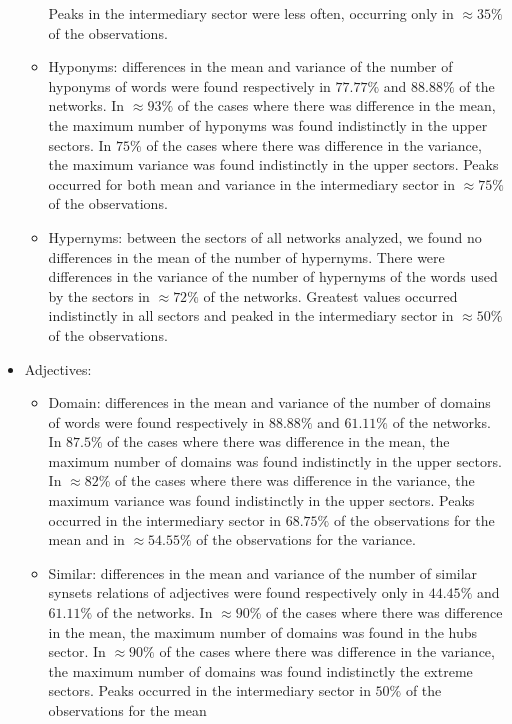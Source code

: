 \begin{itemize}
\begin{itemize}
				Peaks in the intermediary sector were less often, occurring only in $\approx 35\%$ of the observations.
			\item Hyponyms:
				differences in the mean and variance of the number of hyponyms of words were found respectively in $77.77\%$ and $88.88\%$ of the networks.
				In $\approx 93\%$ of the cases where there was difference in the mean, 
				the maximum number of hyponyms was found indistinctly in the upper sectors.
				In $75\%$ of the cases where there was difference in the variance, 
				the maximum variance was found indistinctly in the upper sectors.
				Peaks occurred for both mean and variance in the intermediary sector in $\approx 75\%$ of the observations.
			\item Hypernyms:
				between the sectors of all networks analyzed, we found no differences in the mean of the number of hypernyms.
				There were differences in the variance of the number of hypernyms of the words used by the sectors in $\approx 72\%$ of the networks.
				Greatest values occurred indistinctly in all sectors and peaked in the intermediary sector in $\approx 50\%$ of the observations.
		\end{itemize}
	\item Adjectives:
		\begin{itemize}
			\item Domain:
				differences in the mean and variance of the number of domains of words were found respectively in $88.88\%$ and $61.11\%$ of the networks.
				In $87.5\%$ of the cases where there was difference in the mean, 
				the maximum number of domains was found indistinctly in the upper sectors.
				In $\approx 82\%$ of the cases where there was difference in the variance, 
				the maximum variance was found indistinctly in the upper sectors.
				Peaks occurred in the intermediary sector in $68.75\%$ of the observations for the mean
				and in $\approx 54.55\%$ of the observations for the variance.
			\item Similar:
				differences in the mean and variance of the number of similar synsets relations of adjectives were found respectively only in $44.45\%$ and $61.11\%$ of the networks.
				In $\approx 90\%$ of the cases where there was difference in the mean, 
				the maximum number of domains was found in the hubs sector.
				In $\approx 90\%$ of the cases where there was difference in the variance, 
				the maximum number of domains was found indistinctly the extreme sectors.
				Peaks occurred in the intermediary sector in $50\%$ of the observations for the mean

\end{itemize}
\end{itemize}

